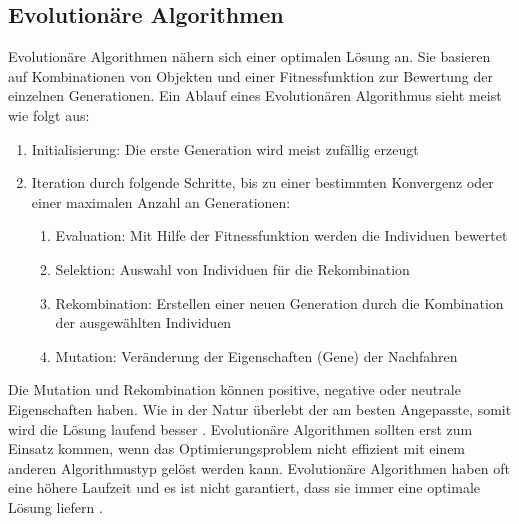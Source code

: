 \subsection{Evolutionäre Algorithmen}\label{ea_algos}
Evolutionäre Algorithmen nähern sich einer optimalen Lösung an. Sie basieren auf Kombinationen von Objekten und einer Fitnessfunktion zur Bewertung der einzelnen Generationen. 
Ein Ablauf eines Evolutionären Algorithmus sieht meist wie folgt aus:
\begin{enumerate}
	\item Initialisierung: Die erste Generation wird meist zufällig erzeugt
	\item Iteration durch folgende Schritte, bis zu einer bestimmten Konvergenz oder einer maximalen Anzahl an Generationen:
     	\begin{enumerate}
		\item Evaluation: Mit Hilfe der Fitnessfunktion werden die Individuen bewertet
         		\item Selektion: Auswahl von Individuen für die Rekombination
         		\item Rekombination: Erstellen einer neuen Generation durch die Kombination der ausgewählten Individuen
         		\item Mutation: Veränderung der Eigenschaften (Gene) der Nachfahren
      	\end{enumerate}
\end{enumerate}
Die Mutation und Rekombination können positive, negative oder neutrale Eigenschaften haben. Wie in der Natur überlebt der am besten Angepasste, somit wird die Lösung laufend 
besser \cite{pomberger2008algorithmen}. Evolutionäre Algorithmen sollten erst zum Einsatz kommen, wenn das Optimierungsproblem nicht effizient mit einem anderen Algorithmustyp 
gelöst werden kann. Evolutionäre Algorithmen haben oft eine höhere Laufzeit und es ist nicht garantiert, dass sie immer eine optimale Lösung liefern \cite{ea_useful}.
